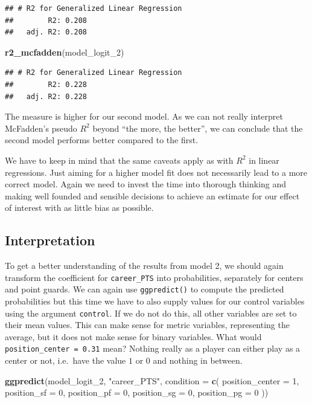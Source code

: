 \documentclass[
]{book}
\newenvironment{Shaded}{\begin{snugshade}}{\end{snugshade}}
\newcommand{\AttributeTok}[1]{\textcolor[rgb]{0.13,0.29,0.53}{#1}}
\newcommand{\DecValTok}[1]{\textcolor[rgb]{0.00,0.00,0.81}{#1}}
\newcommand{\FunctionTok}[1]{\textcolor[rgb]{0.13,0.29,0.53}{\textbf{#1}}}
\newcommand{\NormalTok}[1]{#1}
\newcommand{\StringTok}[1]{\textcolor[rgb]{0.31,0.60,0.02}{#1}}
\begin{document}
\begin{verbatim}
## # R2 for Generalized Linear Regression
##        R2: 0.208
##   adj. R2: 0.208
\end{verbatim}

\begin{Shaded}
\begin{Highlighting}[]
\FunctionTok{r2\_mcfadden}\NormalTok{(model\_logit\_2)}
\end{Highlighting}
\end{Shaded}

\begin{verbatim}
## # R2 for Generalized Linear Regression
##        R2: 0.228
##   adj. R2: 0.228
\end{verbatim}

The measure is higher for our second model. As we can not really
interpret McFadden's pseudo \(R^2\) beyond ``the more, the better'', we can
conclude that the second model performs better compared to the first.

We have to keep in mind that the same caveats apply as with \(R^2\) in
linear regressions. Just aiming for a higher model fit does not
necessarily lead to a more correct model. Again we need to invest the
time into thorough thinking and making well founded and sensible
decisions to achieve an estimate for our effect of interest with as
little bias as possible.

\hypertarget{interpretation-3}{%
\subsection{Interpretation}\label{interpretation-3}}

To get a better understanding of the results from model 2, we should
again transform the coefficient for \texttt{career\_PTS} into probabilities,
separately for centers and point guards. We can again use \texttt{ggpredict()}
to compute the predicted probabilities but this time we have to also
supply values for our control variables using the argument \texttt{control}. If
we do not do this, all other variables are set to their mean values.
This can make sense for metric variables, representing the average,
but it does not make sense for binary variables. What would
\texttt{position\_center\ =\ 0.31} mean? Nothing really as a player can either
play as a center or not, i.e.~have the value \(1\) or \(0\) and nothing in
between.

\begin{Shaded}
\begin{Highlighting}[]
\FunctionTok{ggpredict}\NormalTok{(model\_logit\_2, }\StringTok{"career\_PTS"}\NormalTok{,}
          \AttributeTok{condition =} \FunctionTok{c}\NormalTok{(}
            \AttributeTok{position\_center =} \DecValTok{1}\NormalTok{,}
            \AttributeTok{position\_sf =} \DecValTok{0}\NormalTok{,}
            \AttributeTok{position\_pf =} \DecValTok{0}\NormalTok{,}
            \AttributeTok{position\_sg =} \DecValTok{0}\NormalTok{,}
            \AttributeTok{position\_pg =} \DecValTok{0}
\NormalTok{          ))}
\end{Highlighting}
\end{Shaded}
\end{document}
